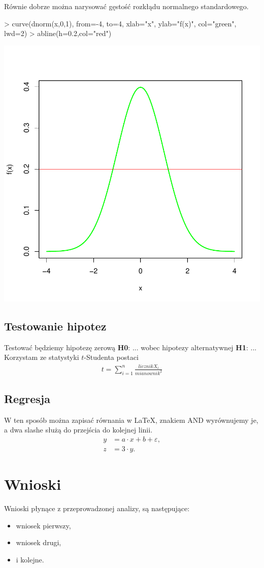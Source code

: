 \documentclass{article}
\begin{document}
Równie dobrze można narysować gęstość rozkłądu normalnego standardowego.
\begin{Schunk}
\begin{Sinput}
> curve(dnorm(x,0,1), from=-4, to=4, xlab="x", ylab="f(x)", col="green", lwd=2)
> abline(h=0.2,col="red")
\end{Sinput}
\end{Schunk}
\includegraphics{Untitled-wykresyNORM}

\subsection{Testowanie hipotez}
Testować będziemy hipotezę zerową {\bf{H0}}: ... wobec hipotezy alternatywnej {\bf{H1}}: ...
Korzystam ze statystyki $t$-Studenta postaci
\begin{align*}
t=\sum_{i=1}^n\frac{licznik X_i}{mianownik^2}
\end{align*}

\subsection{Regresja}

W ten sposób można zapisać równania w \LaTeX, znakiem AND wyrównujemy je, a dwa slashe służą do przejścia do kolejnej linii.
\begin{align*}
y&=a\cdot x+b+\varepsilon,\\
z&=3\cdot y.
\end{align*}

\section{Wnioski}
Wnioski płynące z przeprowadzonej analizy, są następujące:
\begin{itemize}
\item wniosek pierwszy,
\item wniosek drugi,
\item i kolejne.
\end{itemize}
\end{document}
